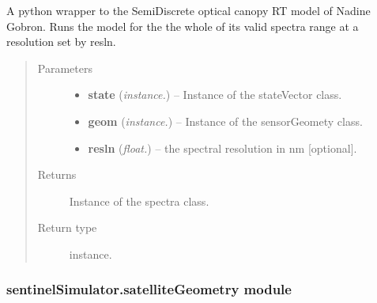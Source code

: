 \documentclass[letterpaper,10pt,english]{sphinxmanual}
\begin{document}
\begin{fulllineitems}
\label{source/sentinelSimulator:sentinelSimulator.opticalCanopyRT.canopyRTOptical}
A python wrapper to the SemiDiscrete optical
canopy RT model of Nadine Gobron. Runs the
model for the the whole of its valid spectra
range at a resolution set by resln.
\begin{quote}\begin{description}
\item[{Parameters}] \leavevmode\begin{itemize}
\item {} 
\textbf{state} (\emph{instance.}) -- Instance of the stateVector class.

\item {} 
\textbf{geom} (\emph{instance.}) -- Instance of the sensorGeomety class.

\item {} 
\textbf{resln} (\emph{float.}) -- the spectral resolution in nm {[}optional{]}.

\end{itemize}

\item[{Returns}] \leavevmode
Instance of the spectra class.

\item[{Return type}] \leavevmode
instance.

\end{description}\end{quote}

\end{fulllineitems}



\subsubsection{sentinelSimulator.satelliteGeometry module}
\label{source/sentinelSimulator:sentinelsimulator-satellitegeometry-module}\label{source/sentinelSimulator:module-sentinelSimulator.satelliteGeometry}
\end{document}
